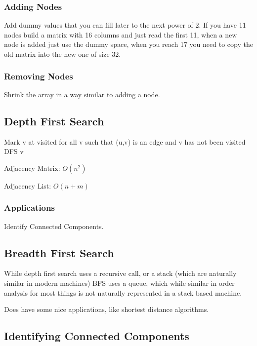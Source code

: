 \documentclass[english, 10pt]{article}
\begin{document}
\subsubsection{Adding Nodes}
Add dummy values that you can fill later to the next power of 2. If you have 11
nodes build a matrix with 16 columns and just read the first 11, when a new
node is added just use the dummy space, when you reach 17 you need to copy the
old matrix into the new one of size 32.

\subsubsection{Removing Nodes}

Shrink the array in a way similar to adding a node.

\subsection{Depth First Search}

\begin{algorithm}
    Mark v at visited\;
    for all v such that (u,v) is an edge and v has not been visited \;
    DFS {v}\;
\end{algorithm}

Adjacency Matrix: $O(n^2)$

Adjacency List: $O(n+m)$

\subsubsection{Applications}
    Identify Connected Components.

\subsection{Breadth First Search}

    While depth first search uses a recursive call, or a stack (which are
    naturally similar in modern machines) BFS uses a queue, which while similar
    in order analysis for most things is not naturally represented in a stack
    based machine.

    Does have some nice applications, like shortest distance algorithms.

\subsection{Identifying Connected Components}
\end{document}
